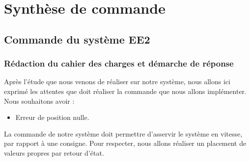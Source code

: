 \chapter{Synthèse de commande}
\label{chap:commande}
\section{Commande du système EE2}
\subsection{Rédaction du cahier des charges et démarche de réponse}
Après l'étude que nous venons de réaliser sur notre système, nous allons ici exprimé les attentes que doit réaliser la commande que nous allons implémenter. Nous souhaitons avoir : \begin{itemize} 
\item Erreur de position nulle.
\end{itemize}
La commande de notre système doit permettre d'asservir le système en vitesse, par rapport à une consigne. Pour respecter, nous allons réaliser un placement de valeurs propres par retour d'état.



